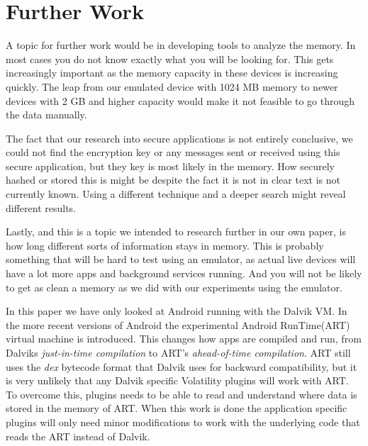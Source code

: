\section{Further Work}
A topic for further work would be in developing tools
to analyze the memory. In most cases you do not know exactly what you will be looking for.
This gets increasingly important as the memory capacity
in these devices is increasing quickly. The leap from our
emulated device with 1024 MB memory to newer devices with
2 GB and higher capacity would make it not feasible to go
through the data manually.

The fact that our research into secure applications is not
entirely conclusive, we could not find the encryption key or any
messages sent or received using this secure application, but
they key is most likely in the memory. How securely hashed
or stored this is might be despite the fact it is not in clear text
is not currently known. Using a different technique and a deeper
search might reveal different results.

Lastly, and this is a topic we intended to research further
in our own paper, is how long different sorts of information
stays in memory. This is probably something that will be hard
to test using an emulator, as actual live devices will have a lot
more apps and background services running. And you will not be
likely to get as clean a memory as we did with our experiments
using the emulator.

In this paper we have only looked at Android running with
the Dalvik VM. In the more recent versions of
Android the experimental Android RunTime(ART) virtual
machine is introduced. This changes how apps are compiled
and run, from Dalviks \textit{just-in-time compilation} to
ART’s \textit{ahead-of-time compilation}. ART still uses the
\textit{dex} bytecode format that Dalvik uses for backward
compatibility, but it is very unlikely that any Dalvik specific
Volatility plugins will work with ART. To overcome this, plugins
needs to be able to read and understand where data is stored in the memory of
ART. When this work is done the application specific plugins will only need
minor modifications to work with the underlying code that reads the ART instead
of Dalvik.

